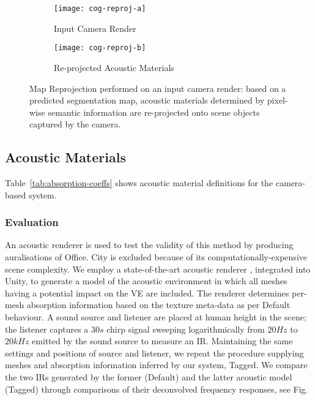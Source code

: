 \begin{figure}
    \centering
    \begin{subfigure}[t]{0.49\textwidth}
       \centering
       \texttt{[image: cog-reproj-a]}
       \caption{Input Camera Render}
       \label{fig:cog-reproj-a}
    \end{subfigure}
    \begin{subfigure}[t]{0.49\textwidth}
       \centering
       \texttt{[image: cog-reproj-b]}
       \caption{Re-projected Acoustic Materials}
       \label{fig:cog-reproj-b}
    \end{subfigure}
\caption[Material tagging segmentation reprojection system]{Map Reprojection performed on an input camera render: based on a predicted segmentation map, acoustic materials determined by pixel-wise semantic information are re-projected onto scene objects captured by the camera.}
\label{fig:cog-reprojection}
\end{figure}

\subsection{Acoustic Materials}
Table~\ref{tab:absorption-coeffs} shows acoustic material definitions for the camera-based system.


\subsubsection{Evaluation}
An acoustic renderer is used to test the validity of this method by producing auralisations of Office. City is excluded because of its computationally-expensive scene complexity. We employ a state-of-the-art acoustic renderer \cite{raghuvanshi2014parametric}, integrated into Unity, to generate a model of the acoustic environment in which all meshes having a potential impact on the VE are included. The renderer determines per-mesh absorption information based on the texture meta-data as per Default behaviour. A sound source and listener are placed at human height in the scene; the listener captures a $30s$ chirp signal sweeping logarithmically from $20Hz$ to $20kHz$ emitted by the sound source to measure an IR. Maintaining the same settings and positions of source and listener, we repeat the procedure supplying meshes and absorption information inferred by our system, Tagged. We compare the two IRs generated by the former (Default) and the latter acoustic model (Tagged) through comparisons of their deconvolved frequency responses, see Fig.

